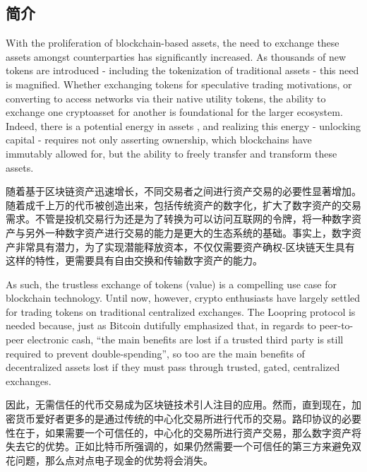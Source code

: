 \documentclass[UTF8,nofonts]{ctexart}
\begin{document}
\begin{multicols}{2}
\section{简介\label{sec:introduction}}

With the proliferation of blockchain-based assets, the need to exchange these assets amongst counterparties has significantly increased. As thousands of new tokens are introduced - including the tokenization of traditional assets - this need is magnified. Whether exchanging tokens for speculative trading motivations, or converting to access networks via their native utility tokens, the ability to exchange one cryptoasset for another is foundational for the larger ecosystem. Indeed, there is a potential energy in assets \cite{desotocapital}, and realizing this energy - unlocking capital - requires not only asserting ownership, which blockchains have immutably allowed for, but the ability to freely transfer and transform these assets.
 
 随着基于区块链资产迅速增长，不同交易者之间进行资产交易的必要性显著增加。随着成千上万的代币被创造出来，包括传统资产的数字化，扩大了数字资产的交易需求。不管是投机交易行为还是为了转换为可以访问互联网的令牌，将一种数字资产与另外一种数字资产进行交易的能力是更大的生态系统的基础。事实上，数字资产非常具有潜力，为了实现潜能释放资本，不仅仅需要资产确权-区块链天生具有这样的特性，更需要具有自由交换和传输数字资产的能力。


As such, the trustless exchange of tokens (value) is a compelling use case for blockchain technology. Until now, however, crypto enthusiasts have largely settled for trading tokens on traditional centralized exchanges. The Loopring protocol is needed because, just as Bitcoin \cite{nakamoto2008bitcoin} dutifully emphasized that, in regards to peer-to-peer electronic cash, \enquote{the main benefits are lost if a trusted third party is still required to prevent double-spending}, so too are the main benefits of decentralized assets lost if they must pass through trusted, gated, centralized exchanges.

因此，无需信任的代币交易成为区块链技术引人注目的应用。然而，直到现在，加密货币爱好者更多的是通过传统的中心化交易所进行代币的交易。路印协议的必要性在于，如果需要一个可信任的，中心化的交易所进行资产交易，那么数字资产将失去它的优势。正如比特币所强调的，如果仍然需要一个可信任的第三方来避免双花问题，那么点对点电子现金的优势将会消失。


\end{multicols}
\end{document}
